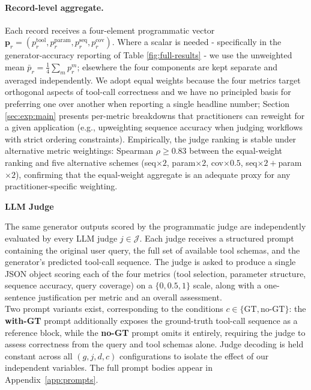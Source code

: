 \paragraph{Record-level aggregate.}
Each record receives a four-element programmatic vector $\mathbf{p}_r = (p^{\text{tool}}_r, p^{\text{param}}_r, p^{\text{seq}}_r, p^{\text{cov}}_r)$. Where a scalar is needed - specifically in the generator-accuracy reporting of Table \ref{fig:full-results} - we use the unweighted mean $\bar{p}_r = \tfrac{1}{4} \sum_m p^m_r$; elsewhere the four components are kept separate and averaged independently. We adopt equal weights because the four metrics target orthogonal aspects of tool-call correctness and we have no principled basis for preferring one over another when reporting a single headline number; Section \ref{sec:exp:main} presents per-metric breakdowns that practitioners can reweight for a given application (e.g., upweighting sequence accuracy when judging workflows with strict ordering constraints). Empirically, the judge ranking is stable under alternative metric weightings: Spearman $\rho \geq 0.83$ between the equal-weight ranking and five alternative schemes (seq${\times}2$, param${\times}2$, cov${\times}0.5$, seq${\times}2{+}$param${\times}2$), confirming that the equal-weight aggregate is an adequate proxy for any practitioner-specific weighting.

\textbf{LLM Judge}
\label{sec:methodology:llmjudge}

The same generator outputs scored by the programmatic judge are independently evaluated by every LLM judge $j \in \mathcal{J}$. Each judge receives a structured prompt containing the original user query, the full set of available tool schemas, and the generator's predicted tool-call sequence. The judge is asked to produce a single JSON object scoring each of the four metrics (tool selection, parameter structure, sequence accuracy, query coverage) on a $\{0, 0.5, 1\}$ scale, along with a one-sentence justification per metric and an overall assessment. \\
Two prompt variants exist, corresponding to the conditions $c \in \{\text{GT}, \text{no-GT}\}$: the \textbf{with-GT} prompt additionally exposes the ground-truth tool-call sequence as a reference block, while the \textbf{no-GT} prompt omits it entirely, requiring the judge to assess correctness from the query and tool schemas alone. Judge decoding is held constant across all $(g, j, d, c)$ configurations to isolate the effect of our independent variables. The full prompt bodies appear in Appendix~\ref{app:prompts}.

